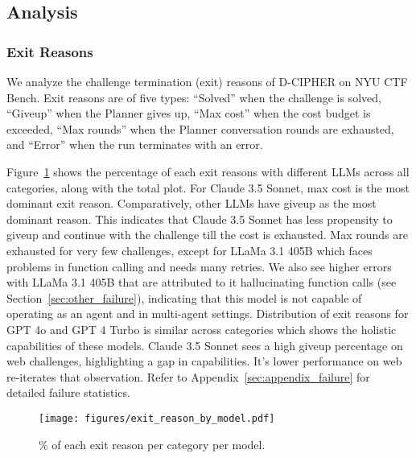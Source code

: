


\subsection{Analysis}
\label{sec:analysis}


\subsubsection{Exit Reasons}
We analyze the challenge termination (exit) reasons of D-CIPHER on NYU CTF Bench.
Exit reasons are of five types: ``Solved'' when the challenge is solved, ``Giveup'' when the Planner gives up, ``Max cost'' when the cost budget is exceeded, ``Max rounds'' when the Planner conversation rounds are exhausted, and ``Error'' when the run terminates with an error.

Figure~\ref{fig:exit_reason} shows the percentage of each exit reasons with different LLMs across all categories, along with the total plot.
For Claude 3.5 Sonnet, max cost is the most dominant exit reason. Comparatively, other LLMs have giveup as the most dominant reason.
This indicates that Claude 3.5 Sonnet has less propensity to giveup and continue with the challenge till the cost is exhausted.
Max rounds are exhausted for very few challenges, except for LLaMa 3.1 405B which faces problems in function calling and needs many retries.
We also see higher errors with LLaMa 3.1 405B that are attributed to it hallucinating function calls (see Section~\ref{sec:other_failure}), indicating that this model is not capable of operating as an agent and in multi-agent settings. 
Distribution of exit reasons for GPT 4o and GPT 4 Turbo is similar across categories which shows the holistic capabilities of these models.
Claude 3.5 Sonnet sees a high giveup percentage on web challenges, highlighting a gap in capabilities. It's lower performance on web re-iterates that observation. Refer to Appendix~\ref{sec:appendix_failure} for detailed failure statistics.

\begin{figure}[h!]
    \centering
    \texttt{[image: figures/exit\_reason\_by\_model.pdf]}
    \caption{\%  of each exit reason per category per model.}
    \label{fig:exit_reason}
\end{figure}

